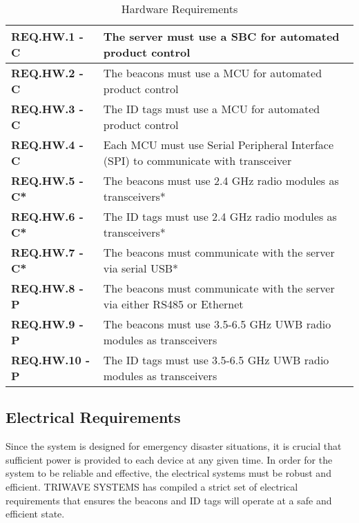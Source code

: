 \bgroup
\def\arraystretch{1.5}
\begin{table}[H]
\centering
\begin{tabular}{ | m{3.25cm} | m{12.5cm} |} 
 \hline
 \textbf{REQ.HW.1 - C} & The server must use a \Gls{SBC} for automated product control \\ 
\hline
 \textbf{REQ.HW.2 - C} & The beacons must use a MCU for automated product control \\ 
\hline
 \textbf{REQ.HW.3 - C} & The ID tags must use a MCU for automated product control \\ 
\hline
 \textbf{REQ.HW.4 - C} & Each MCU must use Serial Peripheral Interface (SPI) to communicate with transceiver \\
\hline
 \textbf{REQ.HW.5 - C*} & The beacons must use 2.4 GHz radio modules as transceivers* \\
\hline
 \textbf{REQ.HW.6 - C*} & The ID tags must use 2.4 GHz radio modules as transceivers*  \\
\hline
 \textbf{REQ.HW.7 - C*} & The beacons must communicate with the server via serial USB* \\
\hline
 \textbf{REQ.HW.8 - P} & The beacons must communicate with the server via either RS485 or Ethernet  \\
\hline
 \textbf{REQ.HW.9 - P} & The beacons must use 3.5-6.5 GHz UWB radio modules as transceivers \\
\hline
 \textbf{REQ.HW.10 - P} & The ID tags must use 3.5-6.5 GHz UWB radio modules as transceivers \\
\hline
\end{tabular}
\caption{Hardware Requirements}
\end{table}	

\break
\subsection{Electrical Requirements}
Since the system is designed for emergency disaster situations, it is crucial that sufficient power is provided to each device at any given time. In order for the system to be reliable and effective, the electrical systems must be robust and efficient. TRIWAVE SYSTEMS has compiled a strict set of electrical requirements that ensures the beacons and ID tags will operate at a safe and efficient state. 

\bigskip

